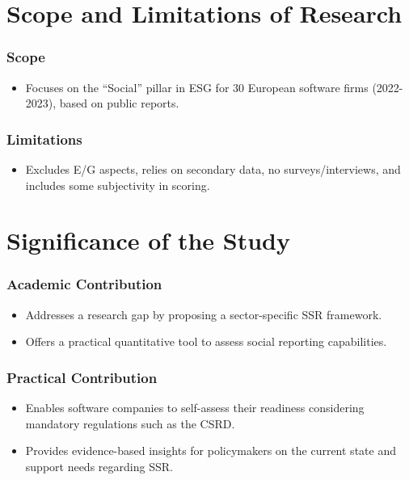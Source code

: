 \section{Scope and Limitations of Research}
\subsubsection{Scope}
\begin{itemize}
    \item Focuses on the “Social” pillar in ESG for 
    30 European software firms (2022-2023), based on public reports.
\end{itemize}

\subsubsection{Limitations}
\begin{itemize}
    \item Excludes E/G aspects, relies on secondary data, 
    no surveys/interviews, and includes some subjectivity in scoring.
\end{itemize}

\section{Significance of the Study}
\subsubsection{Academic Contribution}
\begin{itemize}
    \item Addresses a research gap by proposing a sector-specific SSR framework.
    \item Offers a practical quantitative tool to assess social reporting capabilities.
\end{itemize}

\subsubsection{Practical Contribution}
\begin{itemize}
    \item Enables software companies to self-assess their readiness considering mandatory regulations such as the CSRD.
    \item Provides evidence-based insights for policymakers on the current state and support needs regarding SSR.
\end{itemize}

